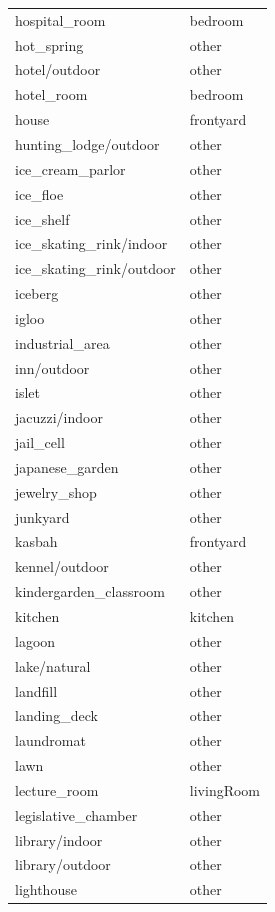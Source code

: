 \begin{table}[h!]
\begin{tabular}{| l | l |}
		hospital\_room &      bedroom \\
		hot\_spring &        other \\
		hotel/outdoor &        other \\
		hotel\_room &      bedroom \\
		house &    frontyard \\
		hunting\_lodge/outdoor &        other \\
		ice\_cream\_parlor &        other \\
		ice\_floe &        other \\
		ice\_shelf &        other \\
		ice\_skating\_rink/indoor &        other \\
		ice\_skating\_rink/outdoor &        other \\
		iceberg &        other \\
		igloo &        other \\
		industrial\_area &        other \\
		inn/outdoor &        other \\
		islet &        other \\
		jacuzzi/indoor &        other \\
		jail\_cell &        other \\
		japanese\_garden &        other \\
		jewelry\_shop &        other \\
		junkyard &        other \\
		kasbah &    frontyard \\
		kennel/outdoor &        other \\
		kindergarden\_classroom &        other \\
		kitchen &      kitchen \\
		lagoon &        other \\
		lake/natural &        other \\
		landfill &        other \\
		landing\_deck &        other \\
		laundromat &        other \\
		lawn &        other \\
		lecture\_room &   livingRoom \\
		legislative\_chamber &        other \\
		library/indoor &        other \\
		library/outdoor &        other \\
		lighthouse &        other \\

\end{tabular}
\end{table}
